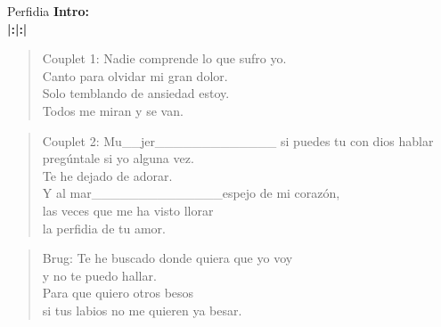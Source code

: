 \begin{song}[bolero]{Perfidia}
\textbf{Intro:}\\
\textbf{|:\hspace{3em}\hspace{3em}|\hspace{3em}\hspace{3em}\hspace{3em}:|} 

\begin{verse}{Couplet 1:}
Nadie comprende lo que sufro yo.\\
Canto para olvidar mi gran dolor.\\
Solo temblando de ansiedad estoy.\\
Todos me miran y se van. \hspace{3em}
\end{verse}


\begin{verse}{Couplet 2:}
Mu\_{}\_{}jer\_{}\_{}\_{}\_{}\_{}\_{}\_{}\_{}\_{}\_{}\_{}\_{}\_{} si puedes tu con dios hablar \hspace{3em}\\
preg\'{u}ntale si yo alguna vez.\\
Te he dejado de adorar. \hspace{3em}\\
Y al mar\_{}\_{}\_{}\_{}\_{}\_{}\_{}\_{}\_{}\_{}\_{}\_{}\_{}\_{}espejo de mi coraz\'{o}n,\hspace{3em}\\
las veces que me ha visto llorar\\
la perfidia de tu amor.\hspace{3em}
\end{verse}

\begin{verse}{Brug:}
Te he buscado donde quiera que yo voy\\
y no te puedo hallar.\\
Para que quiero otros besos\\
si tus labios no me quieren ya besar.\hspace{3em}
\end{verse}


\end{song}
